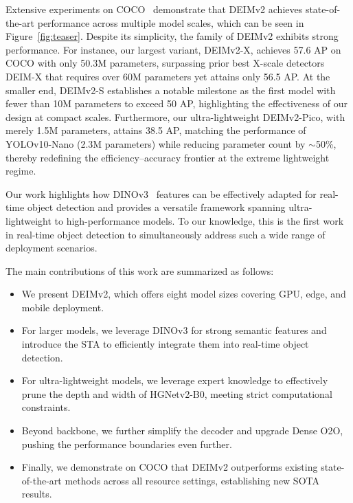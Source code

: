 Extensive experiments on COCO~\cite{lin2014microsoft} demonstrate that DEIMv2 achieves state-of-the-art performance across multiple model scales, which can be seen in Figure~\ref{fig:teaser}. Despite its simplicity, the family of DEIMv2 exhibits strong performance. For instance, our largest variant, DEIMv2-X, achieves 57.6 AP on COCO with only 50.3M parameters, surpassing prior best X-scale detectors DEIM-X that requires over 60M parameters yet attains only 56.5 AP. At the smaller end, DEIMv2-S establishes a notable milestone as the first model with fewer than 10M parameters to exceed 50 AP, highlighting the effectiveness of our design at compact scales. Furthermore, our ultra-lightweight DEIMv2-Pico, with merely 1.5M parameters, attains 38.5 AP, matching the performance of YOLOv10-Nano (2.3M parameters) while reducing parameter count by $\sim$50\%, thereby redefining the efficiency–accuracy frontier at the extreme lightweight regime. 

Our work highlights how DINOv3~\cite{simeoni2025dinov3} features can be effectively adapted for real-time object detection and provides a versatile framework spanning ultra-lightweight to high-performance models. To our knowledge, this is the first work in real-time object detection to simultaneously address such a wide range of deployment scenarios.

The main contributions of this work are summarized as follows:

\begin{itemize}

\item We present DEIMv2, which offers eight model sizes covering GPU, edge, and mobile deployment.

\item For larger models, we leverage DINOv3 for strong semantic features and introduce the STA to efficiently integrate them into real-time object detection.

\item For ultra-lightweight models, we leverage expert knowledge to effectively prune the depth and width of HGNetv2-B0, meeting strict computational constraints. 

\item Beyond backbone, we further simplify the decoder and upgrade Dense O2O, pushing the performance boundaries even further.

\item Finally, we demonstrate on COCO that DEIMv2 outperforms existing state-of-the-art methods across all resource settings, establishing new SOTA results.

\end{itemize}
